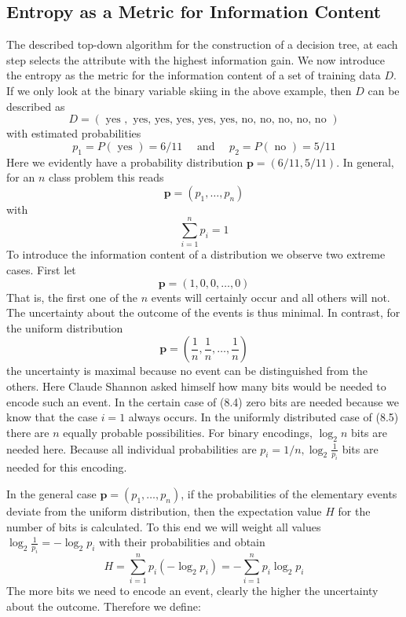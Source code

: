 \documentclass[10pt]{book}
\begin{document}
\subsection{Entropy as a Metric for Information Content}
The described top-down algorithm for the construction of a decision tree, at each step selects the attribute with the highest information gain. We now introduce the entropy as the metric for the information content of a set of training data $D$. If we only look at the binary variable skiing in the above example, then $D$ can be described as
$$
D=(\text { yes }, \text { yes, yes, yes, yes, yes, no, no, no, no, no })
$$
with estimated probabilities
$$
p_{1}=P(\text { yes })=6 / 11 \quad \text { and } \quad p_{2}=P(\text { no })=5 / 11
$$
Here we evidently have a probability distribution $\boldsymbol{p}=(6 / 11,5 / 11)$. In general, for an $n$ class problem this reads
$$
\boldsymbol{p}=\left(p_{1}, \ldots, p_{n}\right)
$$
with
$$
\sum_{i=1}^{n} p_{i}=1
$$
To introduce the information content of a distribution we observe two extreme cases. First let
\begin{equation*}
\boldsymbol{p}=(1,0,0, \ldots, 0) \tag{8.4}
\end{equation*}
That is, the first one of the $n$ events will certainly occur and all others will not. The uncertainty about the outcome of the events is thus minimal. In contrast, for the uniform distribution
\begin{equation*}
\boldsymbol{p}=\left(\frac{1}{n}, \frac{1}{n}, \ldots, \frac{1}{n}\right) \tag{8.5}
\end{equation*}
the uncertainty is maximal because no event can be distinguished from the others. Here Claude Shannon asked himself how many bits would be needed to encode such an event. In the certain case of (8.4) zero bits are needed because we know that the case $i=1$ always occurs. In the uniformly distributed case of (8.5) there are $n$ equally probable possibilities. For binary encodings, $\log _{2} n$ bits are needed here. Because all individual probabilities are $p_{i}=1 / n, \log _{2} \frac{1}{p_{i}}$ bits are needed for this encoding.

In the general case $\boldsymbol{p}=\left(p_{1}, \ldots, p_{n}\right)$, if the probabilities of the elementary events deviate from the uniform distribution, then the expectation value $H$ for the number of bits is calculated. To this end we will weight all values $\log _{2} \frac{1}{p_{i}}=-\log _{2} p_{i}$ with their probabilities and obtain
$$
H=\sum_{i=1}^{n} p_{i}\left(-\log _{2} p_{i}\right)=-\sum_{i=1}^{n} p_{i} \log _{2} p_{i}
$$
The more bits we need to encode an event, clearly the higher the uncertainty about the outcome. Therefore we define:
\end{document}
